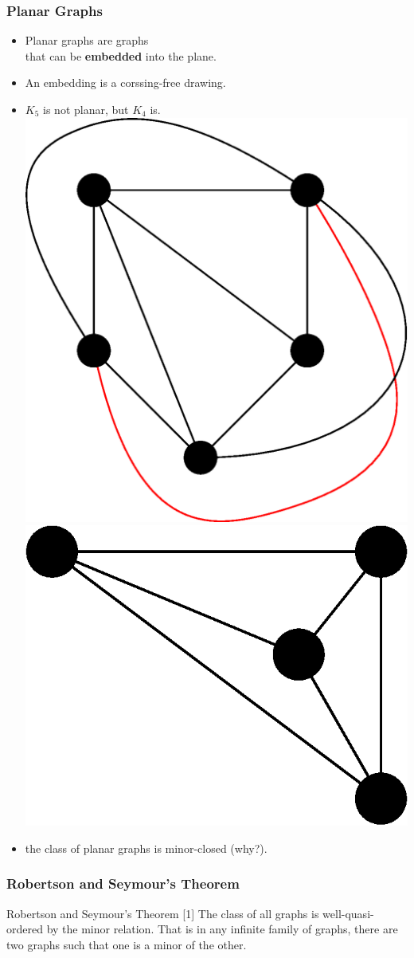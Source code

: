 \documentclass[t,usenames,dvipsnames]{beamer}
\begin{document}
\begin{frame} \frametitle{Planar Graphs}
	\begin{itemize}[<+->]
		\item Planar graphs are graphs\\
			\hspace{1cm}that can be \textbf{embedded} into the plane.
		\item An embedding is a corssing-free drawing.
		\item $K_5$ is not planar, but $K_4$ is.\\
			{
			\includegraphics[width=0.3\linewidth]{k5.eps}
			\hspace{0.2\linewidth}
			\includegraphics[width=0.3\linewidth]{k4.eps}
			}
		\item the class of planar graphs is minor-closed (why?).
	\end{itemize}
\end{frame}
\begin{frame} \frametitle{Robertson and Seymour's Theorem}
	\begin{block}{Robertson and Seymour's Theorem [1]}
		The class of all graphs is well-quasi-ordered by the minor relation. That is in any
		infinite family of graphs, there are two graphs such that one is a minor of the
		other.
	\end{block}
	
\end{frame}
\end{document}
